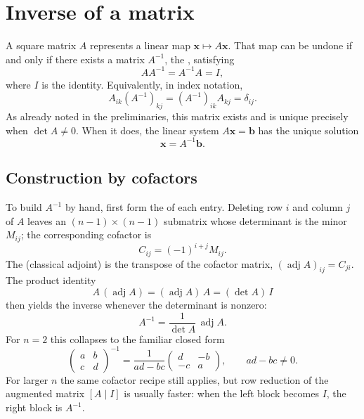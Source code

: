 \section{Inverse of a matrix}

A square matrix $A$ represents a linear map $\mathbf{x}\mapsto A\mathbf{x}$. That map can be undone if and only if there exists a matrix $A^{-1}$, the , satisfying
\begin{equation}
AA^{-1}=A^{-1}A=I,
\end{equation}
where $I$ is the identity. Equivalently, in index notation,
\begin{equation}
A_{ik}(A^{-1})_{kj}=(A^{-1})_{ik}A_{kj}=\delta_{ij}.
\end{equation}
As already noted in the preliminaries, this matrix exists and is unique precisely when $\det A\neq0$. When it does, the linear system $A\mathbf{x}=\mathbf{b}$ has the unique solution
\begin{equation}
\mathbf{x}=A^{-1}\mathbf{b}.
\end{equation}

\subsection{Construction by cofactors}

To build $A^{-1}$ by hand, first form the  of each entry. Deleting row $i$ and column $j$ of $A$ leaves an $(n-1)\times(n-1)$ submatrix whose determinant is the minor $M_{ij}$; the corresponding cofactor is
\begin{equation}
C_{ij}=(-1)^{i+j}M_{ij}.
\end{equation}
The  (classical adjoint) is the transpose of the cofactor matrix, $(\operatorname{adj}A)_{ij}=C_{ji}$. The product identity
\begin{equation}
A\,(\operatorname{adj}A)=(\operatorname{adj}A)\,A=(\det A)\,I
\end{equation}
then yields the inverse whenever the determinant is nonzero:
\begin{equation}
\label{eq:vec-inverse-adjugate}
A^{-1}=\frac{1}{\det A}\,\operatorname{adj}A.
\end{equation}
For $n=2$ this collapses to the familiar closed form
\begin{equation}
\begin{pmatrix}a&b\\c&d\end{pmatrix}^{-1}
=\frac{1}{ad-bc}
\begin{pmatrix}d&-b\\-c&a\end{pmatrix},
\qquad ad-bc\neq0.
\end{equation}
For larger $n$ the same cofactor recipe still applies, but row reduction of the augmented matrix $[A\mid I]$ is usually faster: when the left block becomes $I$, the right block is $A^{-1}$.

